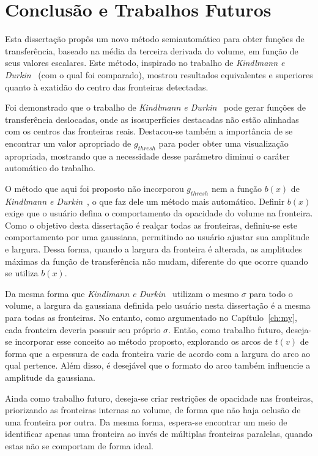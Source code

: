 
\chapter{Conclusão e Trabalhos Futuros}
\label{ch:conclusion}
	Esta dissertação propôs um novo método semiautomático para obter funções de transferência, baseado na média da terceira derivada do volume, em função de seus valores escalares. Este método, inspirado no trabalho de \textit{Kindlmann e Durkin}~\cite{gordon} (com o qual foi comparado), mostrou resultados equivalentes e superiores quanto à exatidão do centro das fronteiras detectadas.

	Foi demonstrado que o trabalho de \textit{Kindlmann e Durkin}~\cite{gordon} pode gerar funções de transferência deslocadas, onde as isosuperfícies destacadas não estão alinhadas com os centros das fronteiras reais. Destacou-se também a importância de se encontrar um valor apropriado de $ g_{thresh} $ para poder obter uma visualização apropriada, mostrando que a necessidade desse parâmetro diminui o caráter automático do trabalho.
	
	O método que aqui foi proposto não incorporou $ g_{thresh} $ nem a função $ b(x) $ de \textit{Kindlmann e Durkin}~\cite{gordon}, o que faz dele um método mais automático. Definir $ b(x) $ exige que o usuário defina o comportamento da opacidade do volume na fronteira. Como o objetivo desta dissertação é realçar todas as fronteiras, definiu-se este comportamento por uma gaussiana, permitindo ao usuário ajustar sua amplitude e largura. Dessa forma, quando a largura da fronteira é alterada, as amplitudes máximas da função de transferência não mudam, diferente do que ocorre quando se utiliza $ b(x) $.
	
	Da mesma forma que \textit{Kindlmann e Durkin}~\cite{gordon} utilizam o mesmo $ \sigma $ para todo o volume, a largura da gaussiana definida pelo usuário nesta dissertação é a mesma para todas as fronteiras. No entanto, como argumentado no Capítulo~\ref{ch:my}, cada fronteira deveria possuir seu próprio $ \sigma $. Então, como trabalho futuro, deseja-se incorporar esse conceito ao método proposto, explorando os arcos de $ t(v) $ de forma que a espessura de cada fronteira varie de acordo com a largura do arco ao qual pertence. Além disso, é desejável que o formato do arco também influencie a amplitude da gaussiana.
	
	Ainda como trabalho futuro, deseja-se criar restrições de opacidade nas fronteiras, priorizando as fronteiras internas ao volume, de forma que não haja oclusão de uma fronteira por outra. Da mesma forma, espera-se encontrar um meio de identificar apenas uma fronteira ao invés de múltiplas fronteiras paralelas, quando estas não se comportam de forma ideal.